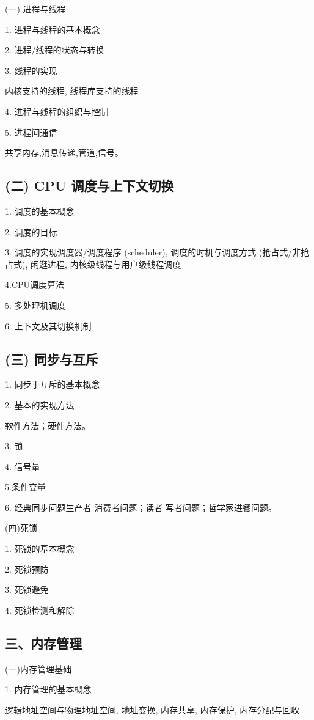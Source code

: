 \documentclass[10pt]{article}
\begin{document}
(一) 进程与线程

1. 进程与线程的基本概念

2. 进程/线程的状态与转换

3. 线程的实现

内核支持的线程, 线程库支持的线程

4. 进程与线程的组织与控制

5. 进程间通信

共享内存,消息传递,管道,信号。

\subsection*{(二) CPU 调度与上下文切换}

1. 调度的基本概念 

2. 调度的目标 

3. 调度的实现调度器/调度程序 (scheduler), 调度的时机与调度方式 (抢占式/非抢占式), 闲逛进程, 内核级线程与用户级线程调度 

4.CPU调度算法

5. 多处理机调度

6. 上下文及其切换机制

\subsection*{(三) 同步与互斥}

1. 同步于互斥的基本概念

2. 基本的实现方法

软件方法；硬件方法。

3. 锁

4. 信号量 

5.条件变量 

6. 经典同步问题生产者-消费者问题；读者-写者问题；哲学家进餐问题。

(四)死锁

1. 死锁的基本概念

2. 死锁预防

3. 死锁避免

4. 死锁检测和解除

\subsection*{三、内存管理}

(一)内存管理基础

1. 内存管理的基本概念

逻辑地址空间与物理地址空间, 地址变换, 内存共享, 内存保护, 内存分配与回收
\end{document}
